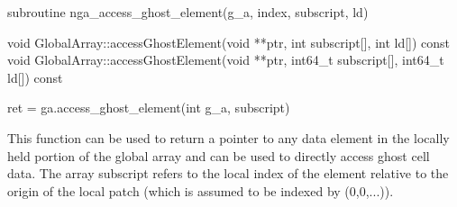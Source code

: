 \documentclass[12pt]{article}
\begin{document}
\begin{fapi}
\begin{fcode}
subroutine nga_access_ghost_element(g_a, index, subscript, ld)
\end{fcode}
\begin{funcargs}
\end{funcargs}
\end{fapi}

\begin{cxxapi}
\begin{cxxcode}
void GlobalArray::accessGhostElement(void **ptr, int subscript[],
                                     int ld[]) const
void GlobalArray::accessGhostElement(void **ptr, int64_t subscript[],
                                     int64_t ld[]) const
\end{cxxcode}
\begin{funcargs}
\end{funcargs}
\end{cxxapi}

\begin{pyapi}
\begin{pycode}
ret = ga.access_ghost_element(int g_a, subscript)
\end{pycode}
\begin{funcargs}
\end{funcargs}
\end{pyapi}

\local

\begin{desc}

This function can be used to return a pointer to any data element in the
locally held portion of the global array and can be used to directly access
ghost cell data. The array subscript refers to the local index of the element
relative to the origin of the local patch (which is assumed to be indexed by
(0,0,...)).

\end{desc}
\end{document}
